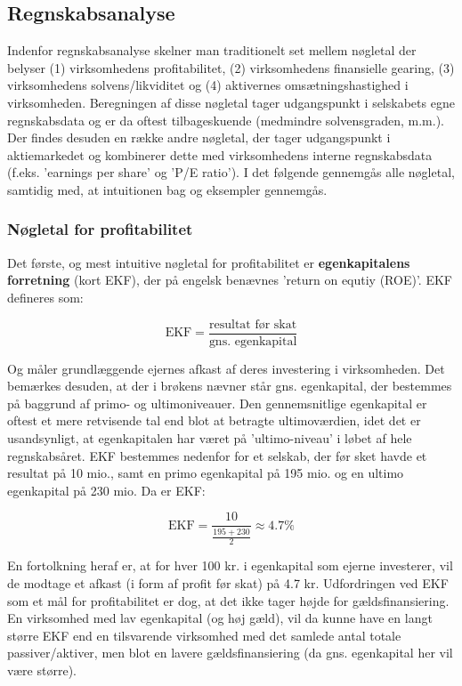 \documentclass[10pt,reqno, usenames]{article}
\begin{document}
\subsection{Regnskabsanalyse}
Indenfor regnskabsanalyse skelner man traditionelt set mellem nøgletal der belyser (1) virksomhedens profitabilitet, (2) virksomhedens finansielle gearing, (3) virksomhedens solvens/likviditet og (4) aktivernes omsætningshastighed i virksomheden. Beregningen af disse nøgletal tager udgangspunkt i selskabets egne regnskabsdata og er da oftest tilbageskuende (medmindre solvensgraden, m.m.). Der findes desuden en række andre nøgletal, der tager udgangspunkt i aktiemarkedet og kombinerer dette med virksomhedens interne regnskabsdata (f.eks. 'earnings per share' og 'P/E ratio'). I det følgende gennemgås alle nøgletal, samtidig med, at intuitionen bag og eksempler gennemgås. 

\subsubsection{Nøgletal for profitabilitet}
Det første, og mest intuitive nøgletal for profitabilitet er \textbf{egenkapitalens forretning} (kort EKF), der på engelsk benævnes 'return on equtiy (ROE)'. EKF defineres som: 

\begin{equation}
    \text{EKF} = \frac{\text{resultat før skat}}{\text{gns. egenkapital}}
\end{equation}

Og måler grundlæggende ejernes afkast af deres investering i virksomheden. Det bemærkes desuden, at der i brøkens nævner står gns. egenkapital, der bestemmes på baggrund af primo- og ultimoniveauer. Den gennemsnitlige egenkapital er oftest et mere retvisende tal end blot at betragte ultimoværdien, idet det er usandsynligt, at egenkapitalen har været på 'ultimo-niveau' i løbet af hele regnskabsåret. EKF bestemmes nedenfor for et selskab, der før sket havde et resultat på 10 mio., samt en primo egenkapital på 195 mio. og en ultimo egenkapital på 230 mio. Da er EKF: 

\begin{equation}
    \text{EKF} = \frac{10}{\frac{195+230}{2}} \approx 4.7 \% \nonumber
\end{equation}

En fortolkning heraf er, at for hver 100 kr. i egenkapital som ejerne investerer, vil de modtage et afkast (i form af profit før skat) på 4.7 kr. Udfordringen ved EKF som et mål for profitabilitet er dog, at det ikke tager højde for gældsfinansiering. En virksomhed med lav egenkapital (og høj gæld), vil da kunne have en langt større EKF end en tilsvarende virksomhed med det samlede antal totale passiver/aktiver, men blot en lavere gældsfinansiering (da gns. egenkapital her vil være større). 
\end{document}
